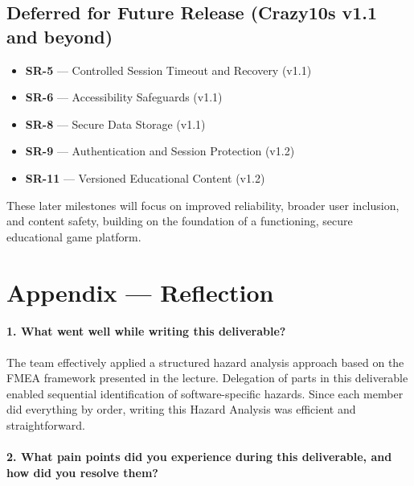 \documentclass{article}
\begin{document}
\subsection{Deferred for Future Release (Crazy10s v1.1 and beyond)}

\begin{itemize}
  \item \textbf{SR-5} — Controlled Session Timeout and Recovery (v1.1)  
  \item \textbf{SR-6} — Accessibility Safeguards (v1.1)  
  \item \textbf{SR-8} — Secure Data Storage (v1.1)  
  \item \textbf{SR-9} — Authentication and Session Protection (v1.2)  
  \item \textbf{SR-11} — Versioned Educational Content (v1.2)
\end{itemize}

\noindent
These later milestones will focus on improved reliability, broader user 
inclusion, and content safety, building on the foundation of a functioning, 
secure educational game platform.

\newpage{}

\section*{Appendix --- Reflection}



\paragraph{1. What went well while writing this deliverable?}

The team effectively applied a structured hazard analysis approach based on 
the FMEA framework presented in the lecture. Delegation of parts in this deliverable 
enabled sequential identification of software-specific hazards.
Since each member did everything by order, writing this Hazard Analysis 
was efficient and straightforward.

\paragraph{2. What pain points did you experience during this deliverable, and how did you resolve them?}
\end{document}
